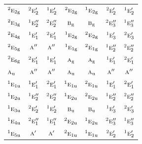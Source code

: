 \documentclass[10pt,a4paper]{article}
\numberwithin{equation}{section}
\newcommand{\irr}[1]{\text{\normalfont\scshape #1}}
\newcommand{\conjpair}[1]{{}^{#1}}
\newcommand{\ptag}[1]{\mathrm{#1}}
\begin{document}
{\begin{longtable}{@{}lcccccc@{}}
$\conjpair{2}\irr{e}_{2\ptag{g}}$ & $\conjpair{2}\irr{e}_{2}'$ & $\conjpair{1}\irr{e}_{2}'$ & $\conjpair{2}\irr{e}_{2\ptag{g}}$ & $\conjpair{1}\irr{e}_{2\ptag{g}}$ & $\conjpair{2}\irr{e}_{2}'$ & $\conjpair{1}\irr{e}_{2}'$\\
$\conjpair{2}\irr{e}_{3\ptag{g}}$ & $\conjpair{1}\irr{e}_{2}''$ & $\conjpair{2}\irr{e}_{2}''$ & $\irr{b}_{\ptag{g}}$ & $\irr{b}_{\ptag{g}}$ & $\conjpair{2}\irr{e}_{3}''$ & $\conjpair{1}\irr{e}_{3}''$\\
$\conjpair{2}\irr{e}_{4\ptag{g}}$ & $\conjpair{1}\irr{e}_{1}'$ & $\conjpair{2}\irr{e}_{1}'$ & $\conjpair{1}\irr{e}_{2\ptag{g}}$ & $\conjpair{2}\irr{e}_{2\ptag{g}}$ & $\conjpair{1}\irr{e}_{3}'$ & $\conjpair{2}\irr{e}_{3}'$\\
$\conjpair{2}\irr{e}_{5\ptag{g}}$ & $\irr{a}''$ & $\irr{a}''$ & $\conjpair{1}\irr{e}_{1\ptag{g}}$ & $\conjpair{2}\irr{e}_{1\ptag{g}}$ & $\conjpair{1}\irr{e}_{2}''$ & $\conjpair{2}\irr{e}_{2}''$\\
$\conjpair{2}\irr{e}_{6\ptag{g}}$ & $\conjpair{2}\irr{e}_{1}'$ & $\conjpair{1}\irr{e}_{1}'$ & $\irr{a}_{\ptag{g}}$ & $\irr{a}_{\ptag{g}}$ & $\conjpair{1}\irr{e}_{1}'$ & $\conjpair{2}\irr{e}_{1}'$\\
$\irr{a}_{\ptag{u}}$ & $\irr{a}''$ & $\irr{a}''$ & $\irr{a}_{\ptag{u}}$ & $\irr{a}_{\ptag{u}}$ & $\irr{a}''$ & $\irr{a}''$\\
$\conjpair{1}\irr{e}_{1\ptag{u}}$ & $\conjpair{1}\irr{e}_{1}'$ & $\conjpair{2}\irr{e}_{1}'$ & $\conjpair{1}\irr{e}_{1\ptag{u}}$ & $\conjpair{2}\irr{e}_{1\ptag{u}}$ & $\conjpair{1}\irr{e}_{1}'$ & $\conjpair{2}\irr{e}_{1}'$\\
$\conjpair{1}\irr{e}_{2\ptag{u}}$ & $\conjpair{1}\irr{e}_{2}''$ & $\conjpair{2}\irr{e}_{2}''$ & $\conjpair{1}\irr{e}_{2\ptag{u}}$ & $\conjpair{2}\irr{e}_{2\ptag{u}}$ & $\conjpair{1}\irr{e}_{2}''$ & $\conjpair{2}\irr{e}_{2}''$\\
$\conjpair{1}\irr{e}_{3\ptag{u}}$ & $\conjpair{2}\irr{e}_{2}'$ & $\conjpair{1}\irr{e}_{2}'$ & $\irr{b}_{\ptag{u}}$ & $\irr{b}_{\ptag{u}}$ & $\conjpair{1}\irr{e}_{3}'$ & $\conjpair{2}\irr{e}_{3}'$\\
$\conjpair{1}\irr{e}_{4\ptag{u}}$ & $\conjpair{2}\irr{e}_{1}''$ & $\conjpair{1}\irr{e}_{1}''$ & $\conjpair{2}\irr{e}_{2\ptag{u}}$ & $\conjpair{1}\irr{e}_{2\ptag{u}}$ & $\conjpair{2}\irr{e}_{3}''$ & $\conjpair{1}\irr{e}_{3}''$\\
$\conjpair{1}\irr{e}_{5\ptag{u}}$ & $\irr{a}'$ & $\irr{a}'$ & $\conjpair{2}\irr{e}_{1\ptag{u}}$ & $\conjpair{1}\irr{e}_{1\ptag{u}}$ & $\conjpair{2}\irr{e}_{2}'$ & $\conjpair{1}\irr{e}_{2}'$\\

\end{longtable}}
\end{document}
